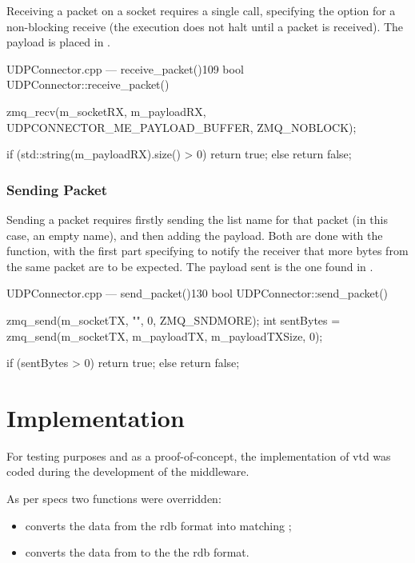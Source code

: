 Receiving a \gls{packet} on a socket requires a single  call, specifying the  option for a non-blocking receive (the execution does not halt until a \gls{packet} is received). The \gls{payload} is placed in .

\begin{codelist}{UDPConnector.cpp --- receive\_packet()}{109}
bool UDPConnector::receive_packet() {
    zmq_recv(m_socketRX, m_payloadRX, UDPCONNECTOR_ME_PAYLOAD_BUFFER, ZMQ_NOBLOCK);

    if (std::string(m_payloadRX).size() > 0)
        return true;
    else
        return false;
}
\end{codelist}

\subsubsection{Sending Packet}

Sending a \gls{packet} requires firstly sending the list name for that \gls{packet} (in this case, an empty name), and then adding the \gls{payload}. Both are done with the  function, with the first part specifying  to notify the receiver that more bytes from the same \gls{packet} are to be expected. The \gls{payload} sent is the one found in .

\begin{codelist}{UDPConnector.cpp --- send\_packet()}{130}
bool UDPConnector::send_packet() {
	zmq_send(m_socketTX, "", 0, ZMQ_SNDMORE);
	int sentBytes = zmq_send(m_socketTX, m_payloadTX, m_payloadTXSize, 0);

	if (sentBytes > 0)
		return true;
	else
		return false;
}
\end{codelist}

\section{ Implementation}\label{sc:middleware:implementation}

For testing purposes and as a proof-of-concept, the implementation of \gls{vtd} was coded during the development of the \gls{middleware}.

As per specs two functions were overridden:

\begin{itemize}
	\item {} converts the data from the \gls{rdb} format into matching ;
	\item {} converts the data from  to the the \gls{rdb} format.
\end{itemize}

